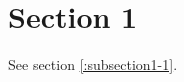 \documentclass[../../main.tex]{subfiles}
\begin{document}
\section{Section 1}\label{section1}

See section \ref{:subsection1-1}.


\end{document}
